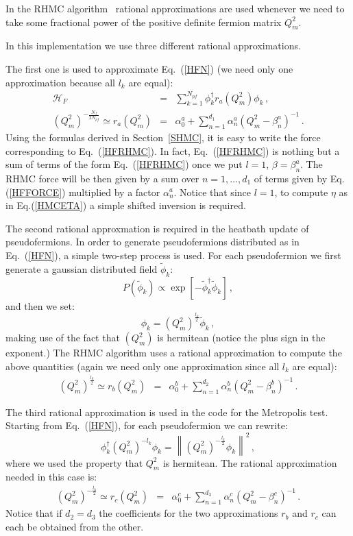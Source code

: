 \documentclass{article}[12pt]
\begin{document}
In the RHMC algorithm~\cite{Clark:2005sq} rational approximations are used whenever we need to take some 
fractional power of the positive definite fermion matrix $Q_m^2$.

In this implementation we use three different rational approximations.

The first one is used to approximate Eq.~(\ref{HFN}) (we need only one approximation because all $l_k$ are equal):
\begin{eqnarray}
\mathcal{H}_F &=& \sum_{k=1}^{N_{pf}} \phi_k^\dagger r_{a}( Q_m^2 )\phi_k \, , \label{HFRHMC}\\ 
( Q_m^2 )^{-\frac{N_f}{2N_{pf}}} \simeq r_{a}(Q_m^2) &=& \alpha_0^a + \sum_{n=1}^{d_{1}} \alpha_n^a ( Q^2_m - \beta_n^a )^{-1} \, .
\end{eqnarray}
Using the formulas derived in Section~\ref{SHMC}, it is easy to write the force corresponding to Eq.~(\ref{HFRHMC}).
In fact, Eq.~(\ref{HFRHMC}) is nothing but a sum of terms of the form Eq.~(\ref{HFRHMC}) once we put $l=1$, $\beta=\beta_n^a$.
The RHMC force will be then given by a sum over $n=1,\dots,d_1$ of terms given by Eq.(\ref{HFFORCE}) multiplied by a factor $\alpha_n^a$.
Notice that since $l=1$, to compute $\eta$ as in Eq.(\ref{HMCETA}) a simple shifted inversion is required.

The second rational approxmation is required in the heatbath update of pseudofermions.
In order to generate pseudofermions distributed as in Eq.~(\ref{HFN}), a simple two-step process is used.
For each pseudofermion we first generate a gaussian distributed field $\tilde\phi_k$:
\begin{equation}
P(\tilde\phi_k)\propto \exp [ -\tilde\phi_k^\dagger \tilde\phi_k ] \, ,
\end{equation}
and then we set:
\begin{equation}
\phi_k = (Q_m^2)^{\frac{l_k}{2}} \tilde\phi_k \, ,
\end{equation}
making use of the fact that $(Q_m^2)$ is hermitean (notice the plus sign in the exponent.) 
The RHMC algorithm uses a rational approximation to compute the above quantities (again we need only one 
approximation since all $l_k$ are equal):
\begin{eqnarray}
( Q_m^2 )^{\frac{l_k}{2}} \simeq r_{b}(Q_m^2) &=& \alpha_0^b + \sum_{n=1}^{d_{2}} \alpha_n^b ( Q^2_m - \beta_n^b )^{-1} \, .
\end{eqnarray}

The third rational approximation is used in the code for the Metropolis test.
Starting from Eq.~(\ref{HFN}), for each pseudofermion we can rewrite:
\begin{equation}
\phi_k^\dagger ( Q_m^2 )^{-l_k}\phi_k = \left\| (Q_m^2)^{-\frac{l_k}{2}} \phi_k \right\|^2\, ,
\end{equation}
where we used the property that $Q_m^2$ is hermitean.
The rational approximation needed in this case is:
\begin{eqnarray}
( Q_m^2 )^{-\frac{l_k}{2}} \simeq r_{c}(Q_m^2) &=& \alpha_0^c + \sum_{n=1}^{d_{3}} \alpha_n^c ( Q^2_m - \beta_n^c )^{-1} \, .
\end{eqnarray}
Notice that if $d_2=d_3$ the coefficients for the two approximations $r_b$ and $r_c$ can each be obtained from the other.
\end{document}
